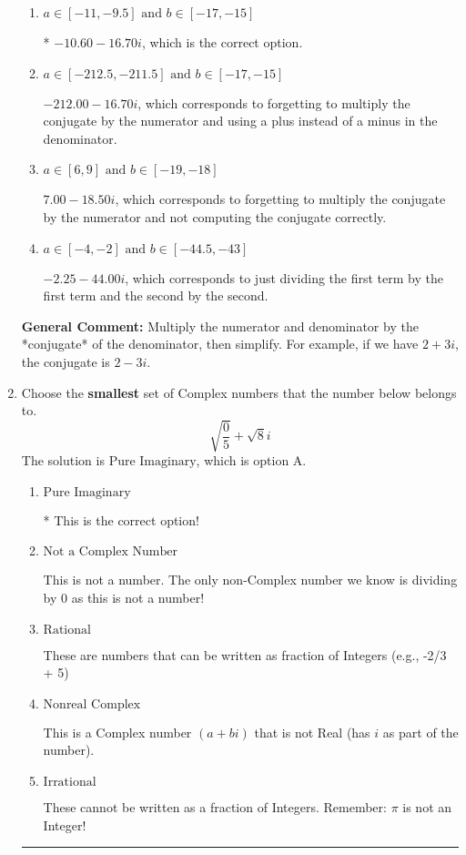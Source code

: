 \documentclass{extbook}[14pt]
\newcommand{\litem}[1]{\item #1

\rule{\textwidth}{0.4pt}}
\begin{document}
\begin{enumerate}
{\begin{enumerate}[label=\Alph*.]
 $-10.60  - 334.00 i$, which corresponds to forgetting to multiply the conjugate by the numerator.
\item \( a \in [-11, -9.5] \text{ and } b \in [-17, -15] \)

* $-10.60  - 16.70 i$, which is the correct option.
\item \( a \in [-212.5, -211.5] \text{ and } b \in [-17, -15] \)

 $-212.00  - 16.70 i$, which corresponds to forgetting to multiply the conjugate by the numerator and using a plus instead of a minus in the denominator.
\item \( a \in [6, 9] \text{ and } b \in [-19, -18] \)

 $7.00  - 18.50 i$, which corresponds to forgetting to multiply the conjugate by the numerator and not computing the conjugate correctly.
\item \( a \in [-4, -2] \text{ and } b \in [-44.5, -43] \)

 $-2.25  - 44.00 i$, which corresponds to just dividing the first term by the first term and the second by the second.
\end{enumerate}

\textbf{General Comment:} Multiply the numerator and denominator by the *conjugate* of the denominator, then simplify. For example, if we have $2+3i$, the conjugate is $2-3i$.
}
\litem{
Choose the \textbf{smallest} set of Complex numbers that the number below belongs to.
\[ \sqrt{\frac{0}{5}}+\sqrt{8}i \]
The solution is \( \text{Pure Imaginary} \), which is option A.\begin{enumerate}[label=\Alph*.]
\item \( \text{Pure Imaginary} \)

* This is the correct option!
\item \( \text{Not a Complex Number} \)

This is not a number. The only non-Complex number we know is dividing by 0 as this is not a number!
\item \( \text{Rational} \)

These are numbers that can be written as fraction of Integers (e.g., -2/3 + 5)
\item \( \text{Nonreal Complex} \)

This is a Complex number $(a+bi)$ that is not Real (has $i$ as part of the number).
\item \( \text{Irrational} \)

These cannot be written as a fraction of Integers. Remember: $\pi$ is not an Integer!
\end{enumerate}

}
\end{enumerate}
\end{document}
